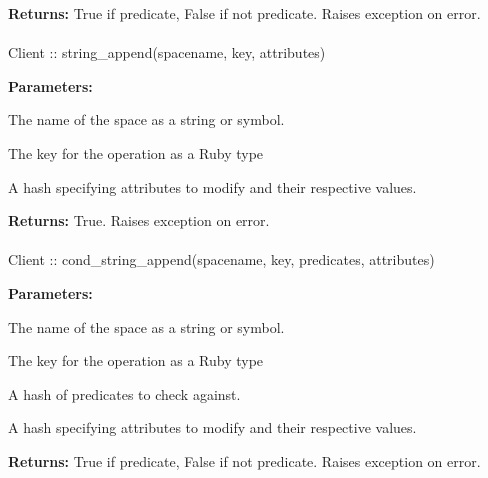 \noindent\textbf{Returns:}
True if predicate, False if not predicate.  Raises exception on error.

\paragraph{}
\begin{ccode}
Client :: string_append(spacename, key, attributes)
\end{ccode}
\funcdesc 

\noindent\textbf{Parameters:}
\begin{description}[labelindent=\widthof{{\code{attributes}}},leftmargin=*,noitemsep,nolistsep,align=right]
\item[\code{spacename}] The name of the space as a string or symbol.
\item[\code{key}] The key for the operation as a Ruby type
\item[\code{attributes}] A hash specifying attributes to modify and their respective values.
\end{description}

\noindent\textbf{Returns:}
True.  Raises exception on error.

\paragraph{}
\begin{ccode}
Client :: cond_string_append(spacename, key, predicates, attributes)
\end{ccode}
\funcdesc 

\noindent\textbf{Parameters:}
\begin{description}[labelindent=\widthof{{\code{predicates}}},leftmargin=*,noitemsep,nolistsep,align=right]
\item[\code{spacename}] The name of the space as a string or symbol.
\item[\code{key}] The key for the operation as a Ruby type
\item[\code{predicates}] A hash of predicates to check against.
\item[\code{attributes}] A hash specifying attributes to modify and their respective values.
\end{description}

\noindent\textbf{Returns:}
True if predicate, False if not predicate.  Raises exception on error.

